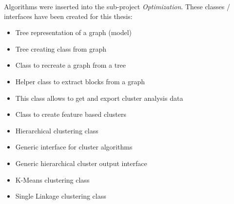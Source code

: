 Algorithms were inserted into the sub-project \textit{Optimization}. These classes / interfaces have been created for this thesis:
\begin{itemize}
    \item Tree representation of a graph (model) \newline
    \item Tree creating class from graph \newline
    \item Class to recreate a graph from a tree \newline
    \item Helper class to extract blocks from a graph \newline
    \item This class allows to get and export cluster analysis data \newline 
    \item  Class to create feature based clusters \newline 
    \item Hierarchical clustering class \newline 
    \item Generic interface for cluster algorithms\newline
    \item Generic hierarchical cluster output interface \newline 
    \item K-Means clustering class \newline
    \item Single Linkage clustering class \newline
\end{itemize}

\pagebreak
